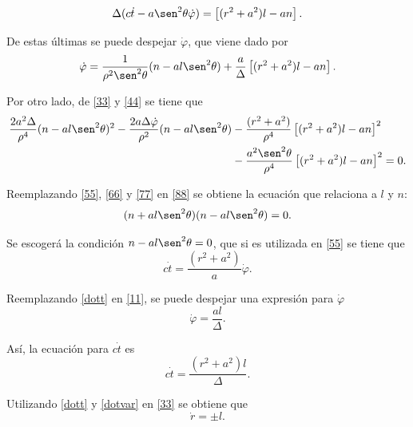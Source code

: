 \begin{equation}\label{66}
\Delta(c\dot{t}-a\sen^2\theta\dot{\varphi})=\left[(r^2+a^2)l-an\right].
\end{equation}
 
De estas \'ultimas se puede despejar $\dot{\varphi}$, que viene dado por
\begin{equation}\label{77}
\dot{\varphi}=\frac{1}{\rho^2\sen^2\theta}(n-al\sen^2\theta)+\frac{a}{\Delta}\left[(r^2+a^2)l-an\right].
\end{equation}
 
 Por otro lado, de \eqref{33} y \eqref{44} se tiene que
 \begin{equation}\label{88}
 \begin{aligned}
 \frac{2a^2\Delta}{\rho^4}(n-al\sen^2\theta)^2-\frac{2a\Delta \dot{\varphi}}{\rho^2}(n-al\sen^2\theta)&-\frac{(r^2+a^2)}{\rho^4}\left[(r^2+a^2)l-an\right]^2\\
 &-\frac{a^2\sen^2\theta}{\rho^4}\left[(r^2+a^2)l-an\right]^2=0.\\
 \end{aligned}
 \end{equation}
 
 Reemplazando \eqref{55}, \eqref{66} y \eqref{77} en \eqref{88} se obtiene la ecuaci\'on que relaciona a $l$ y $n$:
 \begin{equation}
 (n+al\sen^2 \theta)(n-al\sen^2 \theta)=0.
 \end{equation}
 
Se escoger\'a la condici\'on $n-al\sen^2\theta=0$, que si es utilizada en \eqref{55} se tiene que
\begin{equation}\label{dott}
c\dot{t}=\frac{(r^2+a^2)}{a}\dot{\varphi}.
\end{equation}

Reemplazando \eqref{dott} en \eqref{11}, se puede despejar una expresi\'on para $\dot{\varphi}$
\begin{equation}\label{dotvar}
\dot{\varphi}=\frac{al}{\Delta}.
\end{equation}

As\'i, la ecuaci\'on para $c\dot{t}$ es
\begin{equation}\label{dott2}
c\dot{t}=\frac{(r^2+a^2)l}{\Delta}.
\end{equation}

Utilizando \eqref{dott} y \eqref{dotvar} en \eqref{33} se obtiene que
\begin{equation}
\dot{r}=\pm l.
\end{equation}

